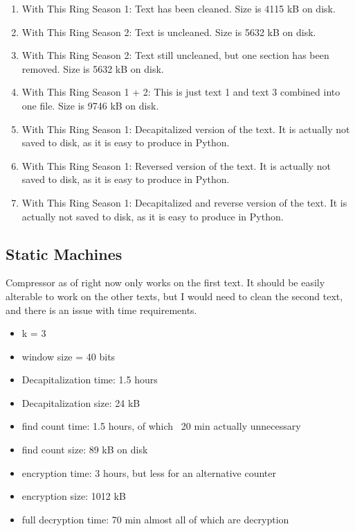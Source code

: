 \documentclass{article}
\begin{document}
\begin{enumerate}
\item With This Ring Season 1: Text has been cleaned. Size is 4115 kB on disk. 
\item With This Ring Season 2: Text is uncleaned. Size is 5632 kB on disk.
\item With This Ring Season 2: Text still uncleaned, but one section has been removed. Size is 5632 kB on disk.
\item With This Ring Season 1 + 2: This is just text 1 and text 3 combined into one file. Size is 9746 kB on disk.
\item With This Ring Season 1: Decapitalized version of the text. It is actually not saved to disk, as it is easy to produce in Python.
\item With This Ring Season 1: Reversed version of the text. It is actually not saved to disk, as it is easy to produce in Python.
\item With This Ring Season 1: Decapitalized and reverse version of the text. It is actually not saved to disk, as it is easy to produce in Python.


\end{enumerate}

\subsection{Static Machines}

Compressor as of right now only works on the first text. It should be easily alterable to work on the other texts, but I would need to clean the second text, and there is an issue with time requirements.

\begin{itemize}
\item k = 3
\item window size = 40 bits
\item Decapitalization time: 1.5 hours
\item Decapitalization size: 24 kB
\item find count time: 1.5 hours, of which ~20 min actually unnecessary
\item find count size: 89 kB on disk
\item encryption time: 3 hours, but less for an alternative counter
\item encryption size: 1012 kB
\item full decryption time: 70 min almost all of which are decryption
\end{itemize}
\end{document}
